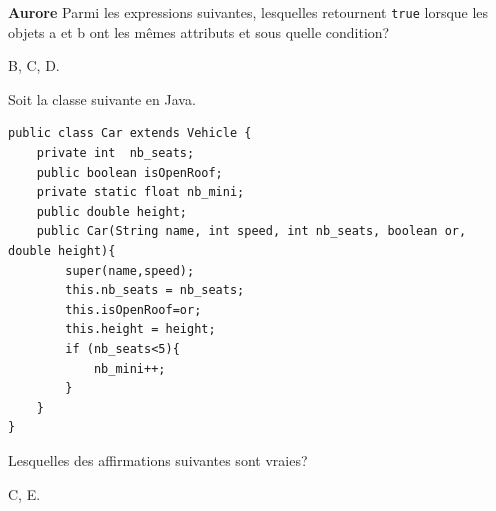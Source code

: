 \begin{Exercice}[5 minutes]\textbf{Aurore}
Parmi les expressions suivantes, lesquelles retournent \texttt{true} lorsque les objets a et b ont les mêmes attributs et sous quelle condition?


\begin{solution}
B, C, D. 
\end{solution}

Soit la classe suivante en Java.

\begin{lstlisting}[style=javastyle]
public class Car extends Vehicle {
    private int  nb_seats;
    public boolean isOpenRoof;
    private static float nb_mini;
    public double height;
    public Car(String name, int speed, int nb_seats, boolean or, double height){
        super(name,speed);
        this.nb_seats = nb_seats;
        this.isOpenRoof=or;
        this.height = height;
        if (nb_seats<5){
            nb_mini++;
        }
    }
}
\end{lstlisting}
Lesquelles des affirmations suivantes sont vraies?

\begin{solution}
C, E.
\end{solution}

\end{Exercice}

